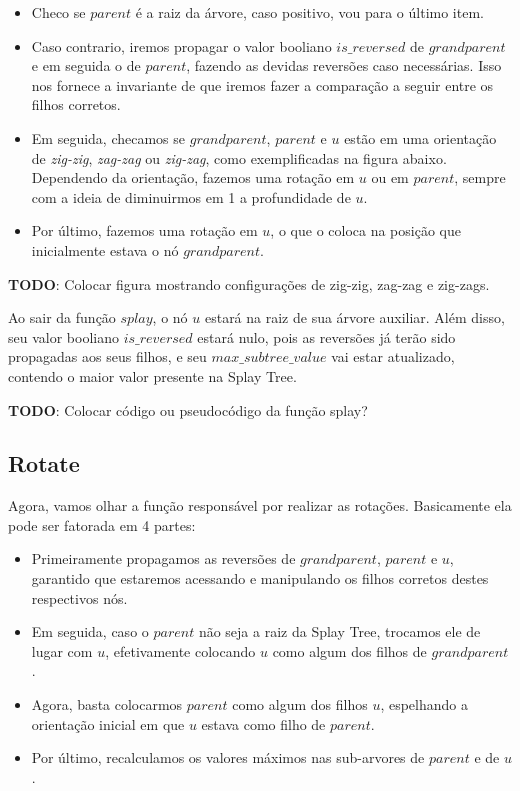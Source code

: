 \begin{itemize}
    \item Checo se $parent$ é a raiz da árvore, caso positivo, vou para o último item.
    \item Caso contrario, iremos propagar o valor booliano $is\_reversed$ de $grandparent$ e em seguida o de $parent$, fazendo as devidas reversões caso necessárias. Isso nos fornece a invariante de que iremos fazer a comparação a seguir entre os filhos corretos.
    \item Em seguida, checamos se $grandparent$, $parent$ e $u$ estão em uma orientação de \textit{zig-zig}, \textit{zag-zag} ou \textit{zig-zag}, como exemplificadas na figura abaixo. Dependendo da orientação, fazemos uma rotação em $u$ ou em $parent$, sempre com a ideia de diminuirmos em 1 a profundidade de $u$.
    \item Por último, fazemos uma rotação em $u$, o que o coloca na posição que inicialmente estava o nó $grandparent$.
\end{itemize}

\begin{center}
    \textbf{TODO}: Colocar figura mostrando configurações de zig-zig, zag-zag e zig-zags.
\end{center}

Ao sair da função $splay$, o nó $u$ estará na raiz de sua árvore auxiliar. Além disso, seu valor booliano $is\_reversed$ estará nulo, pois as reversões já terão sido propagadas aos seus filhos, e seu $max\_subtree\_value$ vai estar atualizado, contendo o maior valor presente na Splay Tree.

\begin{center}
    \textbf{TODO}: Colocar código ou pseudocódigo da função splay?
\end{center}

\subsection{Rotate}
\label{subsection:lct-splay-rotate}

Agora, vamos olhar a função responsável por realizar as rotações. Basicamente ela pode ser fatorada em 4 partes:

\begin{itemize}
    \item Primeiramente propagamos as reversões de $grandparent$, $parent$ e $u$, garantido que estaremos acessando e manipulando os filhos corretos destes respectivos nós.
    \item Em seguida, caso o $parent$ não seja a raiz da Splay Tree, trocamos ele de lugar com $u$, efetivamente colocando $u$ como algum dos filhos de $grandparent$.
    \item Agora, basta colocarmos $parent$ como algum dos filhos $u$, espelhando a orientação inicial em que $u$ estava como filho de $parent$.
    \item Por último, recalculamos os valores máximos nas sub-arvores de $parent$ e de $u$.
\end{itemize}

